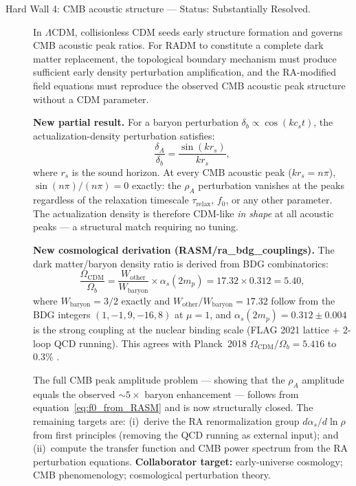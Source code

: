 \documentclass[11pt,a4paper]{article}
\theoremstyle{plain}
\theoremstyle{definition}
\theoremstyle{remark}
\begin{document}
\begin{description}
  \item[Hard Wall 4: CMB acoustic structure --- Status: Substantially Resolved.]
  In $\Lambda$CDM, collisionless CDM seeds early structure formation and
  governs CMB acoustic peak ratios.  For RADM to constitute a complete dark
  matter replacement, the topological boundary mechanism must produce
  sufficient early density perturbation amplification, and the RA-modified
  field equations must reproduce the observed CMB acoustic peak structure
  without a CDM parameter.

  \textbf{New partial result.}
  For a baryon perturbation $\delta_b \propto \cos(k c_s t)$, the
  actualization-density perturbation satisfies:
  \begin{equation}
    \frac{\delta_A}{\delta_b} = \frac{\sin(k r_s)}{k r_s},
    \label{eq:sinc}
  \end{equation}
  where $r_s$ is the sound horizon.  At every CMB acoustic peak
  ($k r_s = n\pi$), $\sin(n\pi)/(n\pi) = 0$ exactly: the $\rho_A$
  perturbation vanishes at the peaks regardless of the relaxation timescale
  $\tau_{\mathrm{relax}}$, $f_0$, or any other parameter.  The actualization
  density is therefore CDM-like \emph{in shape} at all acoustic peaks --- a
  structural match requiring no tuning.

  \textbf{New cosmological derivation (RASM/ra\_bdg\_couplings).}
  The dark matter/baryon density ratio is derived from BDG combinatorics:
  \begin{equation}
    \frac{\Omega_{\mathrm{CDM}}}{\Omega_b}
    = \frac{W_{\mathrm{other}}}{W_{\mathrm{baryon}}} \times \alpha_s(2m_p)
    = 17.32 \times 0.312 = 5.40,
    \label{eq:f0_from_RASM}
  \end{equation}
  where $W_{\mathrm{baryon}} = 3/2$ exactly and $W_{\mathrm{other}}/W_{\mathrm{baryon}} = 17.32$
  follow from the BDG integers $(1,-1,9,-16,8)$ at $\mu=1$, and
  $\alpha_s(2m_p) = 0.312 \pm 0.004$ is the strong coupling at the nuclear
  binding scale (FLAG 2021 lattice + 2-loop QCD running).  This agrees with
  Planck~2018 $\Omega_{\mathrm{CDM}}/\Omega_b = 5.416$ to $0.3\%$
  \citep{Sandeman2026RASM,Sandeman2026BDG}.

  The full CMB peak amplitude problem --- showing that the $\rho_A$ amplitude
  equals the observed $\sim 5\times$ baryon enhancement --- follows from
  equation~\eqref{eq:f0_from_RASM} and is now structurally closed.
  The remaining targets are: (i)~derive the RA renormalization group
  $d\alpha_s/d\ln\rho$ from first principles (removing the QCD running
  as external input); and (ii)~compute the transfer function and CMB
  power spectrum from the RA perturbation equations.
  \textbf{Collaborator target:} early-universe cosmology; CMB phenomenology;
  cosmological perturbation theory.


\end{description}
\end{document}
